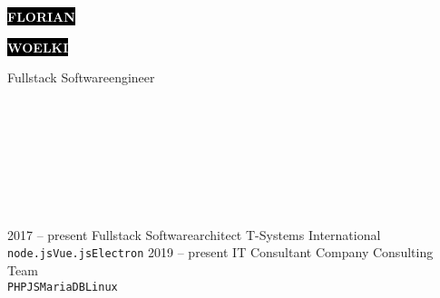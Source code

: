 \documentclass[9pt]{cvstyle}
\begin{document}
\begin{minipage}[t]{0.45\textwidth} 
	\vspace{-\baselineskip}
	
	\colorbox{black}{{\HUGE\textcolor{white}{\textbf{\MakeUppercase{Florian}}}}}
	
	\colorbox{black}{{\HUGE\textcolor{white}{\textbf{\MakeUppercase{Woelki}}}}}
	
	\vspace{6pt}
	
	{\huge Fullstack Softwareengineer}
\end{minipage}
\begin{minipage}[t]{0.275\textwidth}
	\vspace{-\baselineskip}
	
	\\
	\\	
\end{minipage}
\begin{minipage}[t]{0.275\textwidth}
	\vspace{-\baselineskip}
	
	\\
	\\
\end{minipage}

\vspace{0.5cm}


\begin{minipage}[t]{0.4\textwidth} 
	\vspace{-\baselineskip} 
	
	\lorem \lorem \lorem \lorem \lorem\\ 
\end{minipage}
\hfill 
\begin{minipage}[t]{0.5\textwidth} 
	\vspace{-\baselineskip} 
	\begin{barchart}{5.5}
	\end{barchart}
\end{minipage}


\begin{entrylist}
	\entry
		{2017 -- present}
		{Fullstack Softwarearchitect}
		{T-Systems International}
		{\lorem \lorem \lorem\\ \texttt{node.js}\slashsep\texttt{Vue.js}\slashsep\texttt{Electron}}
	\entry
		{2019 -- present}
		{IT Consultant}
		{Company Consulting Team}
		{\lorem\lorem\\ \texttt{PHP}\slashsep\texttt{JS}\slashsep\texttt{MariaDB}\slashsep\texttt{Linux}}
\end{entrylist}
\end{document}
